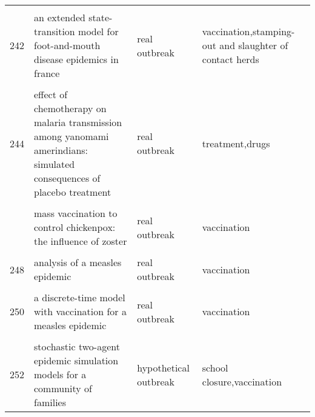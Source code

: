 \documentclass[
]{article}
\begin{document}
\begin{landscape}
\begin{longtable}{l>{\raggedright\arraybackslash}p{3cm}l>{\raggedright\arraybackslash}p{8cm}}
\addlinespace
\cellcolor{gray!6}{241} & \cellcolor{gray!6}{dynamics of the 2001 uk foot and mouth epidemic: stochastic dispersal in a heterogeneous landscape} & \cellcolor{gray!6}{real outbreak} & \cellcolor{gray!6}{culling,vaccination}\\
242 & an extended state-transition model for foot-and-mouth disease epidemics in france & real outbreak & vaccination,stamping-out and slaughter of contact herds\\
\cellcolor{gray!6}{243} & \cellcolor{gray!6}{simulated economic consequences of foot-and-mouth disease epidemics and their public control in france} & \cellcolor{gray!6}{hypothetical outbreak} & \cellcolor{gray!6}{stamping out}\\
244 & effect of chemotherapy on malaria transmission among yanomami amerindians: simulated consequences of placebo treatment & real outbreak & treatment,drugs\\
\cellcolor{gray!6}{245} & \cellcolor{gray!6}{modelling vaccination strategy against directly transmitted diseases using a series of pulses} & \cellcolor{gray!6}{hypothetical outbreak} & \cellcolor{gray!6}{vaccination}\\
\addlinespace
246 & mass vaccination to control chickenpox: the influence of zoster & real outbreak & vaccination\\
\cellcolor{gray!6}{247} & \cellcolor{gray!6}{an evaluation of alternate control strategies for foot-and-mouth disease in australia: a regional approach} & \cellcolor{gray!6}{hypothetical outbreak} & \cellcolor{gray!6}{vaccination,stamping out,dangerous contact slaughter}\\
248 & analysis of a measles epidemic & real outbreak & vaccination\\
\cellcolor{gray!6}{249} & \cellcolor{gray!6}{a model of the transmission of dengue fever with an evaluation of the impact of ultra-low volume (ulv) insecticide applications on dengue epidemics} & \cellcolor{gray!6}{hypothetical outbreak} & \cellcolor{gray!6}{ultra-low volume (ulv) insecticide applications}\\
250 & a discrete-time model with vaccination for a measles epidemic & real outbreak & vaccination\\
\addlinespace
\cellcolor{gray!6}{251} & \cellcolor{gray!6}{a stochastic model of epidemics in military recruits} & \cellcolor{gray!6}{hypothetical outbreak} & \cellcolor{gray!6}{isolation,quarantine}\\
252 & stochastic two-agent epidemic simulation models for a community of families & hypothetical outbreak & school closure,vaccination\\*
\end{longtable}
\endgroup{}
\end{landscape}
\end{document}

